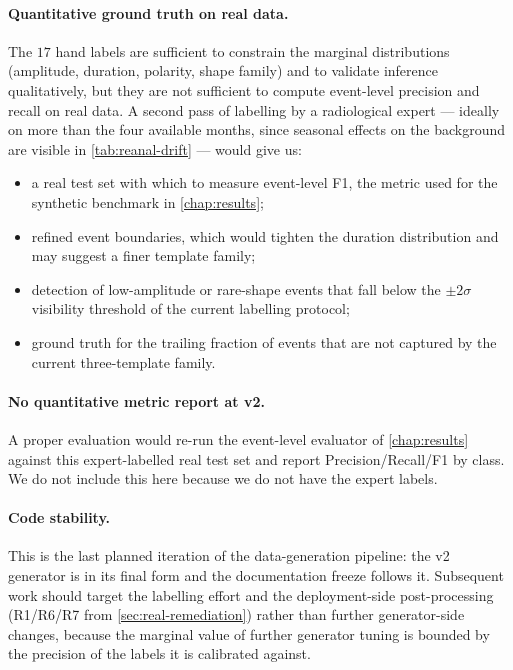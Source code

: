 \paragraph{Quantitative ground truth on real data.}
The $17$ hand labels are sufficient to constrain the marginal
distributions (amplitude, duration, polarity, shape family) and
to validate inference qualitatively, but they are not sufficient
to compute event-level precision and recall on real data. A second
pass of labelling by a radiological expert --- ideally on more than
the four available months, since seasonal effects on the background
are visible in \cref{tab:reanal-drift} --- would give us:
\begin{itemize}[leftmargin=*, itemsep=0.2em]
    \item a real test set with which to measure event-level F1, the
    metric used for the synthetic benchmark in \cref{chap:results};
    \item refined event boundaries, which would tighten the duration
    distribution and may suggest a finer template family;
    \item detection of low-amplitude or rare-shape events that fall
    below the $\pm 2\sigma$ visibility threshold of the current
    labelling protocol;
    \item ground truth for the trailing fraction of events that are
    not captured by the current three-template family.
\end{itemize}

\paragraph{No quantitative metric report at v2.}
A proper evaluation would re-run the event-level evaluator of
\cref{chap:results} against this expert-labelled real test set and
report Precision/Recall/F1 by class. We do not include this here
because we do not have the expert labels.

\paragraph{Code stability.}
This is the last planned iteration of the data-generation pipeline:
the v2 generator is in its final form and the documentation freeze
follows it. Subsequent work should target the labelling effort and
the deployment-side post-processing (R1/R6/R7 from
\cref{sec:real-remediation}) rather than further generator-side
changes, because the marginal value of further generator tuning is
bounded by the precision of the labels it is calibrated against.
